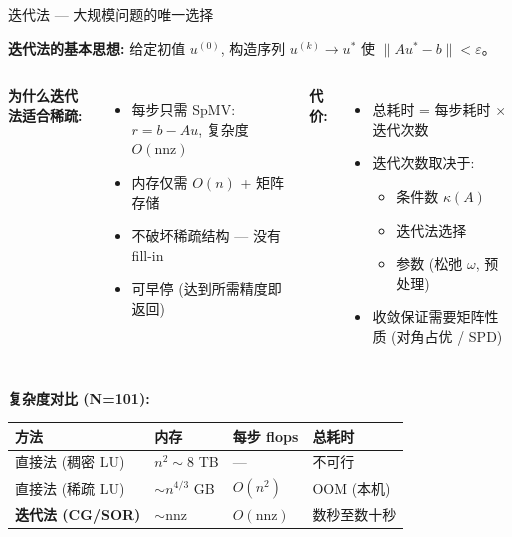 \documentclass[12pt,aspectratio=169]{beamer}
\begin{document}
\begin{frame}[shrink]{迭代法 — 大规模问题的唯一选择}

\textbf{迭代法的基本思想:} 给定初值 $u^{(0)}$, 构造序列 $u^{(k)} \to u^*$ 使 $\|Au^* - b\| < \varepsilon$。

\vspace{4pt}
\begin{columns}[T]
\textbf{为什么迭代法适合稀疏:}
\begin{itemize}\itemsep1pt
  \item 每步只需 SpMV: $r = b - Au$, 复杂度 $O(\text{nnz})$
  \item 内存仅需 $O(n)$ + 矩阵存储
  \item 不破坏稀疏结构 — 没有 fill-in
  \item 可早停 (达到所需精度即返回)
\end{itemize}

\textbf{代价:}
\begin{itemize}\itemsep1pt
  \item 总耗时 = 每步耗时 $\times$ 迭代次数
  \item 迭代次数取决于:
  \begin{itemize}\footnotesize
    \item 条件数 $\kappa(A)$
    \item 迭代法选择
    \item 参数 (松弛 $\omega$, 预处理)
  \end{itemize}
  \item 收敛保证需要矩阵性质 (对角占优 / SPD)
\end{itemize}
\end{columns}

\vspace{6pt}
\textbf{复杂度对比 (N=101):}

\footnotesize
\begin{center}
\renewcommand{\arraystretch}{1.1}
\begin{tabular}{@{}llll@{}}
\toprule
方法 & 内存 & 每步 flops & 总耗时 \\
\midrule
直接法 (稠密 LU)   & $n^2 \sim 8$ TB    & ---       & 不可行 \\
直接法 (稀疏 LU)   & $\sim n^{4/3}$ GB  & $O(n^2)$  & OOM (本机) \\
\textbf{迭代法 (CG/SOR)} & $\sim \text{nnz}$  & $O(\text{nnz})$ & 数秒至数十秒 \\
\bottomrule
\end{tabular}
\end{center}
\end{frame}
\end{document}

